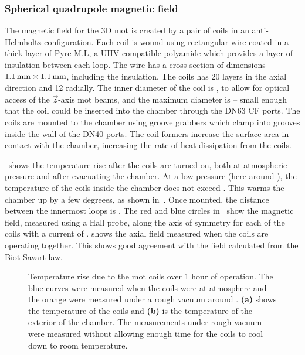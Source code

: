\subsubsection{Spherical quadrupole magnetic field}
The magnetic field for the 3D \ac{mot} is created by a pair of coils in an
anti-Helmholtz configuration. Each coil is wound using rectangular wire coated in a
 thick layer of Pyre-M.L, a UHV-compatible polyamide
which provides a layer of insulation between each loop. The wire has a
cross-section of dimensions \(\sivalue{1.1}{\milli\metre} \times
\sivalue{1.1}{\milli\metre}\), including the insulation. The coils has
20 layers in the axial direction and 12 radially. The
inner diameter of the coil is , to allow for optical
access of the \(\vec{z}\)-axis \ac{mot} beams, and the maximum diameter is
 -- small enough that the coil could be
inserted into the chamber through the DN63 CF ports. The coils are mounted to
the chamber using groove grabbers which clamp into grooves inside the wall of
the DN40 ports. The coil formers increase the surface area in contact
with the chamber, increasing the rate of heat dissipation from the
coils. 
\par\noindent 
{}~shows the temperature rise after the
coils are turned on, both at atmospheric pressure and after evacuating
the chamber. At a low pressure (here around
), the
temperature of the coils inside the chamber does not exceed
. This warms the chamber up by a few degreees,
as shown in~. Once mounted, the distance between the
innermost
loops is . The red and blue circles in~
 show the
magnetic field, measured using a Hall probe, along the axis of symmetry for each
of the coils with a current of .
 shows the axial field measured when the coils
are operating together. This shows good agreement with the field
calculated from the Biot-Savart law.
\begin{figure}[!htbp]
	\centering
	\def\svgwidth{\columnwidth}
	\caption[\ac{mot} coil temperature rise]{Temperature rise due to the
  \ac{mot} coils over 1 hour of operation. The blue curves were
measured when the coils were at atmosphere and the orange were
measured under a rough vacuum around .
\textbf{(a)} shows the temperature of the coils and \textbf{(b)} is
the temperature of the exterior of the chamber. The measurements under
rough vacuum were measured without allowing enough time for the coils
to cool down to room temperature.}
	\label{fig:mot_coil_temp_both}
\end{figure}

